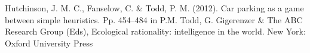 \begin{thebibliography}{50}
	 Hutchinson, J. M. C., Fanselow, C. \& Todd, P. M. (2012). Car parking as a game between simple heuristics. Pp. 454–484 in P.M. Todd, G. Gigerenzer \& The ABC Research Group (Eds), Ecological rationality: intelligence in the world. New York: Oxford University Press
\end{thebibliography}